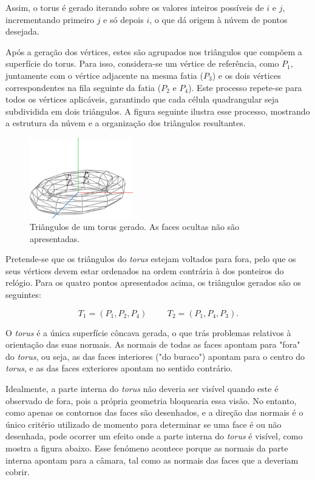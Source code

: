 \documentclass[12pt, a4paper]{article}
\begin{document}
Assim, o torus é gerado iterando sobre os valores inteiros possíveis de $i$ e $j$, incrementando
primeiro $j$ e só depois $i$, o que dá origem à núvem de pontos desejada.

Após a geração dos vértices, estes são agrupados nos triângulos que compõem a superfície do torus.
Para isso, considera-se um vértice de referência, como $P_1$, juntamente com o vértice adjacente
na mesma fatia ($P_3$) e os dois vértices correspondentes na fila seguinte da fatia ($P_2$ e
$P_4$).
Este processo repete-se para todos os vértices aplicáveis, garantindo que cada célula quadrangular
seja subdividida em dois triângulos. A figura seguinte ilustra esse processo, mostrando a estrutura
da núvem e a organização dos triângulos resultantes.

\begin{figure}[H]
    \centering
    \includegraphics[width=0.4\textwidth]{res/figures/TorusTriangle.pdf}
    \caption{Triângulos de um torus gerado. As faces ocultas não são apresentadas.}
\end{figure}

Pretende-se que os triângulos do \emph{torus} estejam voltados para fora, pelo que os seus vértices
devem estar ordenados na ordem contrária à dos ponteiros do relógio. Para os quatro pontos
apresentados acima, os triângulos gerados são os seguintes:

$$
T_1 = (P_1, P_2, P_4)
\hspace{1cm}
T_2 = (P_1, P_4, P_3).
$$

O \emph{torus} é a única superfície côncava gerada, o que trás problemas relativos à orientação das
suas normais. As normais de todas as faces apontam para "fora"{} do \emph{torus}, ou seja, as das
faces interiores ("do buraco"{}) apontam para o centro do \emph{torus}, e as das faces exteriores
apontam no sentido contrário.

Idealmente, a parte interna do \emph{torus} não deveria ser visível quando este é observado de fora,
pois a própria geometria bloquearia essa visão. No entanto, como apenas os contornos das faces são
desenhados, e a direção das normais é o único critério utilizado de momento para determinar se uma
face é ou não desenhada, pode ocorrer um efeito onde a parte interna do \emph{torus} é visível, como
mostra a figura abaixo. Esse fenómeno acontece porque as normais da parte interna apontam para a
câmara, tal como as normais das faces que a deveriam cobrir.
\end{document}
